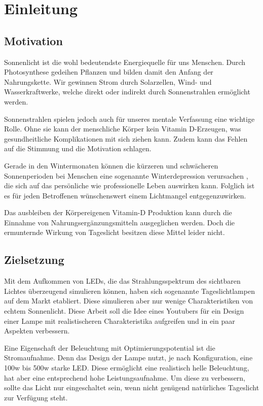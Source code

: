 \chapter{Einleitung}


\section{Motivation}
Sonnenlicht ist die wohl bedeutendste Energiequelle für uns Menschen. Durch Photosynthese gedeihen Pflanzen und bilden damit den Anfang der Nahrungskette. Wir gewinnen Strom durch Solarzellen, Wind- und Wasserkraftwerke, welche direkt oder indirekt durch Sonnenstrahlen ermöglicht werden.

Sonnenstrahlen spielen jedoch auch für unseres mentale Verfassung eine wichtige Rolle. Ohne sie kann der menschliche Körper kein Vitamin D-Erzeugen, was gesundheitliche Komplikationen mit sich ziehen kann. Zudem kann das Fehlen auf die Stimmung und die Motivation schlagen.

Gerade in den Wintermonaten können die kürzeren und schwächeren Sonnenperioden bei Menschen eine sogenannte \glqq Winterdepression\grqq{} verursachen \cite{Ban20}, die sich auf das persönliche wie professionelle Leben auswirken kann. Folglich ist es für jeden Betroffenen wünschenswert einem Lichtmangel entgegenzuwirken.

Das ausbleiben der Körpereigenen Vitamin-D Produktion kann durch die Einnahme von Nahrungsergänzungsmitteln ausgeglichen werden. Doch die ermunternde Wirkung von Tageslicht besitzen diese Mittel leider nicht.

\section{Zielsetzung}
Mit dem Aufkommen von LEDs, die das Strahlungsspektrum des sichtbaren Lichtes überzeugend simulieren können, haben sich sogenannte Tageslichtlampen auf dem Markt etabliert. Diese simulieren aber nur wenige Charakteristiken von echtem Sonnenlicht. Diese Arbeit soll die Idee eines Youtubers für ein Design einer Lampe mit realistischeren Charakteristika aufgreifen und in ein paar Aspekten verbessern.

Eine Eigenschaft der Beleuchtung mit Optimierungspotential ist die Stromaufnahme. Denn das Design der Lampe nutzt, je nach Konfiguration, eine 100w bis 500w starke LED. Diese ermöglicht eine realistisch helle Beleuchtung, hat aber eine entsprechend hohe Leistungsaufnahme. Um diese zu verbessern, sollte das Licht nur eingeschaltet sein, wenn nicht genügend natürliches Tageslicht zur Verfügung steht. 

